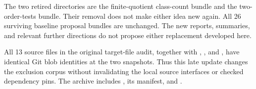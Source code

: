 The two retired directories are the finite-quotient class-count bundle and the
two-order-tests bundle. Their removal does not make either idea new again.
All 26 surviving baseline proposal bundles are unchanged. The new reports,
summaries, and relevant further directions do not propose either replacement
developed here.

All 13 source files in the original target-file audit, together with
, , and , have
identical Git blob identities at the two snapshots. Thus this late update changes
the exclusion corpus without invalidating the local source interfaces or checked
dependency pins. The archive includes ,
its manifest, and .
